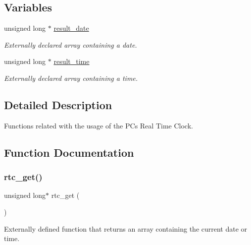 \subsection*{Variables}
\begin{DoxyCompactItemize}
\item 
\hypertarget{group__rtc_gadc2ce94d90a689e95b0f88f7209bae2b}{}\label{group__rtc_gadc2ce94d90a689e95b0f88f7209bae2b} 
unsigned long $\ast$ \hyperlink{group__rtc_gadc2ce94d90a689e95b0f88f7209bae2b}{result\+\_\+date}
\begin{DoxyCompactList}\small\item\em Externally declared array containing a date. \end{DoxyCompactList}\item 
\hypertarget{group__rtc_ga3ee7a67468f7238ecea0abc3f33eb1ed}{}\label{group__rtc_ga3ee7a67468f7238ecea0abc3f33eb1ed} 
unsigned long $\ast$ \hyperlink{group__rtc_ga3ee7a67468f7238ecea0abc3f33eb1ed}{result\+\_\+time}
\begin{DoxyCompactList}\small\item\em Externally declared array containing a time. \end{DoxyCompactList}\end{DoxyCompactItemize}


\subsection{Detailed Description}
Functions related with the usage of the PC\textquotesingle{}s Real Time Clock. 



\subsection{Function Documentation}
\hypertarget{group__rtc_ga4ca5626e3ae7e8da1ad9183a7e6aa999}{}\label{group__rtc_ga4ca5626e3ae7e8da1ad9183a7e6aa999} 
\subsubsection{\texorpdfstring{rtc\+\_\+get()}{rtc\_get()}}
{\footnotesize\ttfamily unsigned long$\ast$ rtc\+\_\+get (\begin{DoxyParamCaption}{ }\end{DoxyParamCaption})}



Externally defined function that returns an array containing the current date or time. 

